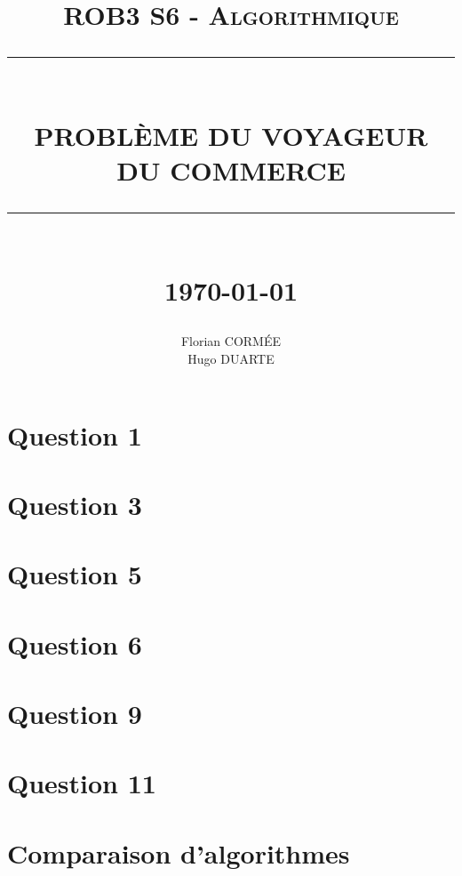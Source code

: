 \documentclass[12pt]{report}
\newcommand{\HRule}[1]{\rule{\linewidth}{#1}}
\begin{document}
\title{
	    \normalsize \textsc{ROB3 S6 - Algorithmique}
		\\ [1.0cm]
		\HRule{0.5pt} \\
		\LARGE \textbf{\uppercase{Problème du voyageur\\du commerce}}
		\HRule{2pt} \\ [0.5cm]
		\normalsize \today{} \vspace*{5\baselineskip}}
\date{}
\author{
		Florian CORMÉE \\
		Hugo DUARTE}
\maketitle
\tableofcontents
\newpage

\section*{Question 1}


\section*{Question 3}


\section*{Question 5}


\section*{Question 6}


\section*{Question 9}


\section*{Question 11}


\newpage
\section*{Comparaison d'algorithmes}

\end{document}
